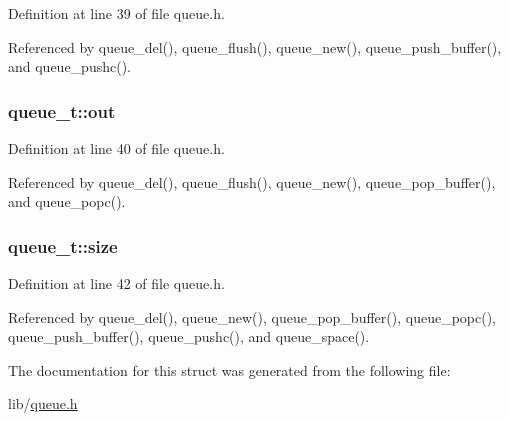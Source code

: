 Definition at line 39 of file queue.\+h.



Referenced by queue\+\_\+del(), queue\+\_\+flush(), queue\+\_\+new(), queue\+\_\+push\+\_\+buffer(), and queue\+\_\+pushc().

\subsubsection[{\texorpdfstring{out}{out}}]{ queue\+\_\+t\+::out}\hypertarget{structqueue__t_a8f6e1c623d2ceed398a71a0aab93b0fa}{}\label{structqueue__t_a8f6e1c623d2ceed398a71a0aab93b0fa}


Definition at line 40 of file queue.\+h.



Referenced by queue\+\_\+del(), queue\+\_\+flush(), queue\+\_\+new(), queue\+\_\+pop\+\_\+buffer(), and queue\+\_\+popc().

\subsubsection[{\texorpdfstring{size}{size}}]{ queue\+\_\+t\+::size}\hypertarget{structqueue__t_a83a13b888f9d4ef127d706559818b779}{}\label{structqueue__t_a83a13b888f9d4ef127d706559818b779}


Definition at line 42 of file queue.\+h.



Referenced by queue\+\_\+del(), queue\+\_\+new(), queue\+\_\+pop\+\_\+buffer(), queue\+\_\+popc(), queue\+\_\+push\+\_\+buffer(), queue\+\_\+pushc(), and queue\+\_\+space().



The documentation for this struct was generated from the following file\+:\begin{DoxyCompactItemize}
\item 
lib/\hyperlink{queue_8h}{queue.\+h}\end{DoxyCompactItemize}
